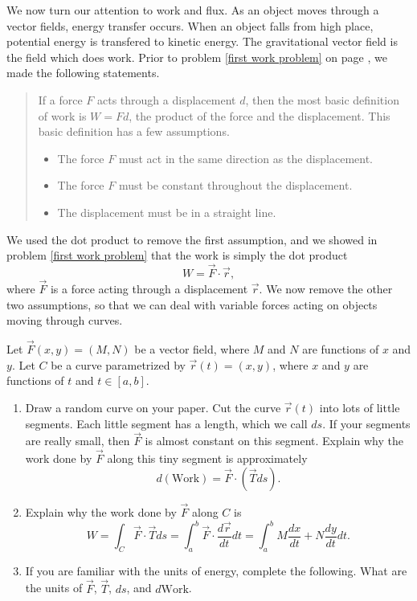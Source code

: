 We now turn our attention to work and flux.  As an object moves through a vector fields, energy transfer occurs.  When an object falls from high place, potential energy is transfered to kinetic energy. The gravitational vector field is the field which does work. Prior to problem \ref{first work problem} on page \pageref{first work problem}, we made the following statements. 
\begin{quote}If a force $F$ acts through a displacement $d$, then the most basic definition of work is $W=Fd$, the product of the force and the displacement.  This basic definition has a few assumptions.
\begin{itemize}
\item The force $F$ must act in the same direction as the displacement.
\item The force $F$ must be constant throughout the  displacement.
\item The displacement must be in a straight line.
\end{itemize}
\end{quote}
We used the dot product to remove the first assumption, and we showed in problem \ref{first work problem} that the work is simply the dot product $$W=\vec F\cdot \vec r,$$
where $\vec F$ is a force acting through a displacement $\vec r$. We now remove the other two assumptions, so that we can deal with variable forces acting on objects moving through curves.

\begin{problem}[Work]
%
 Let $\vec F(x,y)=(M,N)$ be a vector field, where $M$ and $N$ are functions of $x$ and $y$.   Let $C$ be a curve parametrized by $\vec r(t)=(x,y)$, where $x$ and $y$ are functions of $t$ and $t\in[a,b]$. 
\begin{enumerate}
 \item Draw a random curve on your paper.  Cut the curve $\vec r(t)$ into lots of little segments. Each little segment has a length, which we call $ds$. If your segments are really small, then $\vec F$ is almost constant on this segment.  Explain why the work done by $\vec F$ along this tiny segment is approximately $$d(\text{Work}) = \vec F\cdot (\vec T ds).$$
 \item Explain why the work done by $\vec F$ along $C$ is 
$$
W=\int_C \vec F\cdot \vec T ds 
= \int_a^b\vec F\cdot \frac{d\vec r}{dt}dt 
= \int_a^b M\frac{dx}{dt}+N\frac{dy}{dt} dt.
$$
 \item If you are familiar with the units of energy, complete the following. What are the units of $\vec F$,  $\vec T$, $ds$, and $d\text{Work}$.
\end{enumerate}
\end{problem}



